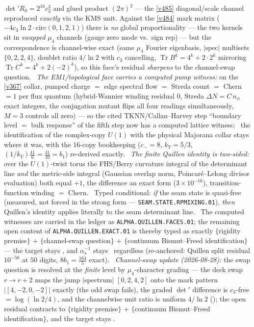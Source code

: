 \documentclass[11pt,a4paper]{article}
\newcommand{\cthree}{c_3}
\newcommand{\ainv}{\alpha^{-1}_\star}
\theoremstyle{definition}
\begin{document}
$\det\nolimits'R_0=2^{16}\cthree^3$ and glued product $(2\pi)^2$ --- the \vref{v485} diagonal/scale
channel reproduced \emph{exactly} via the KMS unit. Against the \vref{v484} mark matrix
($-4\cthree\ln2\cdot\mathrm{circ}(0,1,2,1)$) there is \emph{no} global proportionality --- the two
kernels sit in \emph{swapped} $\mu_4$ channels (gauge zero mode vs.\ sign rep) --- but the
correspondence is channel-wise exact (same $\mu_4$ Fourier eigenbasis, $|\mathrm{spec}|$ multisets
$\{0,2,2,4\}$, doublet ratio $4/\ln2$ with $\cthree$ cancelling,
$\operatorname{Tr}B^k=4^k+2\cdot2^k$ mirroring $\operatorname{Tr}C^k=4^k+2(-2)^k$), so this face's
residual \emph{sharpens} to the channel-swap question. \mE\ \emph{The EM1/topological face carries a
computed pump witness:} on the \vref{v367} collar, pumped charge $=$ edge spectral flow $=$ Streda
count $=$ Chern $=1$ per flux quantum (hybrid-Wannier winding residual $0$, Streda
$\Delta N=C\,n_\phi$ exact integers, the conjugation mutant flips all four readings simultaneously,
$M{=}3$ controls all zero) --- so the cited TKNN/Callan--Harvey step ``boundary level $=$ bulk
response'' of the fifth step now has a computed lattice witness; \mC\ the identification of the
complex-copy $U(1)$ with the physical Majorana collar stays where it was, with the $16$-copy
bookkeeping ($c_-{=}8$, $k_Y{=}5/3$, $(1/k_Y)\tfrac{41}6=\tfrac{41}{10}=b_1$) re-derived exactly.
\mE\ \emph{The finite Quillen identity is two-sided:} over the $U(1)$-twist torus the FHS/Berry
curvature integral of the determinant line \emph{and} the metric-side integral (Gaussian overlap norm,
Poincar\'e--Lelong divisor evaluation) both equal $+1$, the difference an exact form
($3\times10^{-16}$), transition-function winding $=$ Chern. \mC\ Typed conditional: \emph{if} the seam
state is quasi-free (measured, not forced in the strong form --- \texttt{SEAM.STATE.RPMIXING.01}),
\emph{then} Quillen's identity applies literally to the seam determinant line. \mE\ The computed
witnesses are carried in the ledger as \texttt{ALPHA.QUILLEN.FACES.01}; the remaining open content of
\texttt{ALPHA.QUILLEN.EXACT.01} is thereby typed as exactly $\{$rigidity premise$\}$ $+$
$\{$channel-swap question$\}$ $+$ $\{$continuum Bismut--Freed identification$\}$ --- the target stays
\mO, and $\ainv$ stays \mE\ regardless (re-anchored: Quillen split residual $10^{-58}$ at $50$ digits,
$8b_1=\tfrac{164}5$ exact). \mE\ \emph{Channel-swap update (2026-08-28):} the swap question is
resolved at the \emph{finite} level by $\mu_4$-character grading --- the deck swap $r\to r{+}2$
maps the jump $|$spectrum$|$ $[0,2,4,2]$ onto the mark pattern $|[4,-2,0,-2]|$ exactly (the odd
swap fails), the graded $\det'$ difference is $\cthree$-free $=\log(\ln2/4)$, and the channelwise
unit ratio is uniform $4/\ln2$ (); the open residual
contracts to $\{$rigidity premise$\}$ $+$ $\{$continuum Bismut--Freed identification$\}$, and the
target stays \mO.
\par\smallskip
\end{document}
